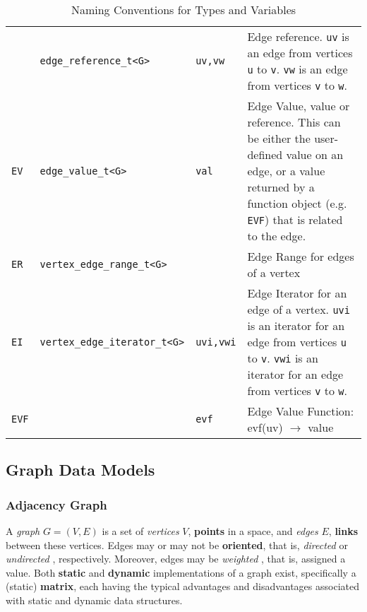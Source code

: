 \documentclass[10pt,onecolumn]{article}
\newcommand{\tcode}[1]{\lstinline[breaklines=true]{#1}}
\begin{document}
\begin{table}[h!]
\begin{center}
{\begin{tabular}{l l l p{7cm}}
    & \tcode{edge_reference_t<G>} & \tcode{uv,vw} & Edge reference. \tcode{uv} is an edge from vertices \tcode{u} to \tcode{v}. \tcode{vw} is an edge from vertices \tcode{v} to \tcode{w}.  \\
    \tcode{EV} &  \tcode{edge_value_t<G>} & \tcode{val} & Edge Value, value or reference. This can be either the user-defined value on an edge, or a value returned by a function object (e.g. \tcode{EVF}) that is related to the edge. \\
    \tcode{ER} &  \tcode{vertex_edge_range_t<G>} & & Edge Range for edges of a vertex \\
    \tcode{EI} & \tcode{vertex_edge_iterator_t<G>} & \tcode{uvi,vwi} & Edge Iterator for an edge of a vertex. \tcode{uvi} is an iterator for an edge from vertices \tcode{u} to \tcode{v}. \tcode{vwi} is an iterator for an edge from vertices \tcode{v} to \tcode{w}. \\
    \tcode{EVF} & & \tcode{evf} & Edge Value Function: evf(uv) $\rightarrow$ value \\
\hline
\end{tabular}}
\caption{Naming Conventions for Types and Variables}
\label{tab:name_conv}
\end{center}
\end{table}

\subsection{Graph Data Models}
\subsubsection{Adjacency Graph}
 A \textit{graph} \cite{REF_graph} $G = (V, E)$ is a set of \textit{vertices} \cite{REF_graph} $V$, \textbf{points} in a space, and \textit{edges} \cite{REF_graph} $E$, \textbf{links} between these vertices. Edges may or may not be \textbf{oriented}, that is, \textit{directed} \cite{REF_graph} or \textit{undirected} \cite{REF_graph}, respectively. Moreover, edges may be \textit{weighted} \cite{REF_graph}, that is, assigned a value. Both \textbf{static} and \textbf{dynamic} implementations of a graph exist, specifically a (static) \textbf{matrix}, each having the typical advantages and disadvantages associated with static and dynamic data structures.

\end{document}
